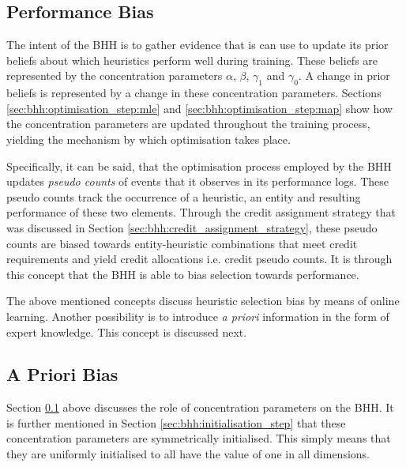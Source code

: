 \subsection{Performance Bias}
\label{sec:bhh:optimisation_step:performance_bias}

The intent of the \ac{BHH} is to gather evidence that is can use to update its prior beliefs about which heuristics perform well during training. These beliefs are represented by the concentration parameters $\alpha$, $\beta$, $\gamma_{1}$ and $\gamma_{0}$. A change in prior beliefs is represented by a change in these concentration parameters. Sections \ref{sec:bhh:optimisation_step:mle} and \ref{sec:bhh:optimisation_step:map} show how the concentration parameters are updated throughout the training process, yielding the mechanism by which optimisation takes place.

Specifically, it can be said, that the optimisation process employed by the \ac{BHH} updates \textit{pseudo counts} of events that it observes in its performance logs. These pseudo counts track the occurrence of a heuristic, an entity and resulting performance of these two elements. Through the credit assignment strategy that was discussed in Section \ref{sec:bhh:credit_assignment_strategy}, these pseudo counts are biased towards entity-heuristic combinations that meet credit requirements and yield credit allocations i.e. credit pseudo counts. It is through this concept that the \ac{BHH} is able to bias selection towards performance.

The above mentioned concepts discuss heuristic selection bias by means of online learning. Another possibility is to introduce \textit{a priori} information in the form of expert knowledge. This concept is discussed next.

\subsection{A Priori Bias}
\label{sec:bhh:optimisation_step:a_priori_bias}

Section \ref{sec:bhh:optimisation_step:performance_bias} above discusses the role of concentration parameters on the \ac{BHH}. It is further mentioned in Section \ref{sec:bhh:initialisation_step} that these concentration parameters are symmetrically initialised. This simply means that they are uniformly initialised to all have the value of one in all dimensions.

